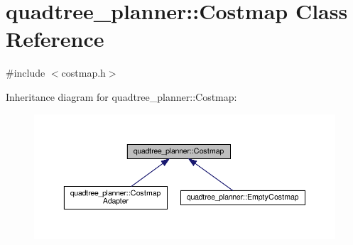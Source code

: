 \hypertarget{classquadtree__planner_1_1Costmap}{}\section{quadtree\+\_\+planner\+:\+:Costmap Class Reference}
\label{classquadtree__planner_1_1Costmap}


{\ttfamily \#include $<$costmap.\+h$>$}



Inheritance diagram for quadtree\+\_\+planner\+:\+:Costmap\+:\nopagebreak
\begin{figure}[H]
\begin{center}
\leavevmode
\includegraphics[width=350pt]{classquadtree__planner_1_1Costmap__inherit__graph}
\end{center}
\end{figure}
